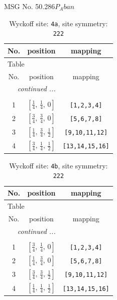 \documentclass[fleqn,8pt]{jsarticle}
\begin{document}
\setcounter{MaxMatrixCols}{32}

\renewcommand{\tablename}{Table~}
\renewcommand{\figurename}{Figure~}
\begin{center}
\LARGE
MSG No. 50.286\quad$P_{A}ban$
\end{center}
\renewcommand{\arraystretch}{1.2}
\begin{longtable}{ccc}
\caption{Wyckoff site: {\tt 4a}, site symmetry: {\tt 222}}
 \\
 \hline \hline
No. & position & mapping \\ \hline \endfirsthead

\multicolumn{2}{l}{\tablename\ \thetable{}} \\
 \hline \hline
No. & position & mapping \\ \hline \endhead

 \hline \hline
\multicolumn{2}{r}{\footnotesize\it continued ...} \\ \endfoot

 \hline \hline
\multicolumn{2}{r}{} \\ \endlastfoot

1 & $\left[ \frac{1}{4},\, \frac{1}{4},\, 0 \right]$ & {\tt [1,2,3,4]} \\ \hline
2 & $\left[ \frac{3}{4},\, \frac{3}{4},\, 0 \right]$ & {\tt [5,6,7,8]} \\ \hline
3 & $\left[ \frac{1}{4},\, \frac{3}{4},\, \frac{1}{2} \right]$ & {\tt [9,10,11,12]} \\ \hline
4 & $\left[ \frac{3}{4},\, \frac{1}{4},\, \frac{1}{2} \right]$ & {\tt [13,14,15,16]} \\
\end{longtable}
\renewcommand{\arraystretch}{1.2}
\begin{longtable}{ccc}
\caption{Wyckoff site: {\tt 4b}, site symmetry: {\tt 222}}
 \\
 \hline \hline
No. & position & mapping \\ \hline \endfirsthead

\multicolumn{2}{l}{\tablename\ \thetable{}} \\
 \hline \hline
No. & position & mapping \\ \hline \endhead

 \hline \hline
\multicolumn{2}{r}{\footnotesize\it continued ...} \\ \endfoot

 \hline \hline
\multicolumn{2}{r}{} \\ \endlastfoot

1 & $\left[ \frac{3}{4},\, \frac{1}{4},\, 0 \right]$ & {\tt [1,2,3,4]} \\ \hline
2 & $\left[ \frac{1}{4},\, \frac{3}{4},\, 0 \right]$ & {\tt [5,6,7,8]} \\ \hline
3 & $\left[ \frac{3}{4},\, \frac{3}{4},\, \frac{1}{2} \right]$ & {\tt [9,10,11,12]} \\ \hline
4 & $\left[ \frac{1}{4},\, \frac{1}{4},\, \frac{1}{2} \right]$ & {\tt [13,14,15,16]} \\
\end{longtable}
\end{document}
